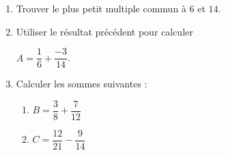 \begin{exercice*}
    \begin{spacing}{1.5}
        \begin{enumerate}
            \item Trouver le plus petit multiple commun à $6$ et $14$.        
            \item Utiliser le résultat précédent pour calculer 
            
            $A=\dfrac{1}{6}+\dfrac{-3}{14}$.
            \item Calculer les sommes suivantes :
            \begin{enumerate}
                \item $B=\dfrac{3}{8}+\dfrac{7}{12}$
                \item $C=\dfrac{12}{21}-\dfrac{9}{14}$
            \end{enumerate}        
        \end{enumerate}
    \end{spacing}
\end{exercice*}
